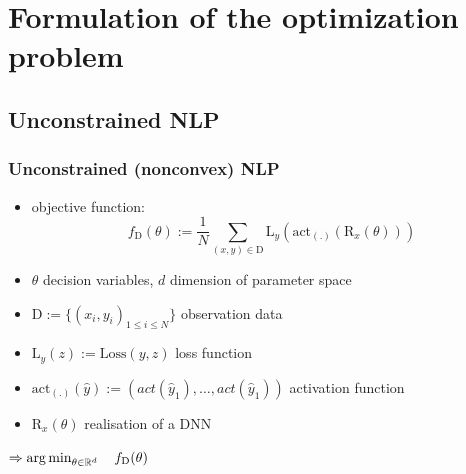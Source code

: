 

\beamertemplatenavigationsymbolsempty{}




\section{Formulation of the optimization problem}

\subsection{Unconstrained NLP}

\begin{frame}
\frametitle{Unconstrained (nonconvex) NLP}
\begin{itemize}
	
	\item[] objective function:
	$$f_{\mathrm{D}}(\theta) := \frac{1}{N}\sum_{(x, y)\in\mathrm{D}}^{}\mathrm{L}_{y}(\text{act}_{(.)}(\mathrm{R}_{x}(\theta)))$$
	\pause
	
	\item $\theta$ decision variables, $d$ dimension of parameter space
	
	\item $\mathrm{D} := \{(x_{i}, y_{i})_{1\leq i\leq N}\}$ observation data
	
	\item $\mathrm{L}_{y}(z) := \text{Loss}(y, z)$ loss function 
	
	\item $\text{act}_{(.)}(\hat{y}) := \left(act(\hat{y}_{1}), \ldots, act(\hat{y}_{1})\right)$ activation function %
	
	\item $\mathrm{R}_{x}(\theta)$ realisation of a DNN
	
\end{itemize}

\begin{center}
	$\Rightarrow \operatorname*{arg\,min}_{\theta\in\mathbb{R}^{d}}\quad f_{\mathrm{D}}(\theta)$
\end{center}

\end{frame}











